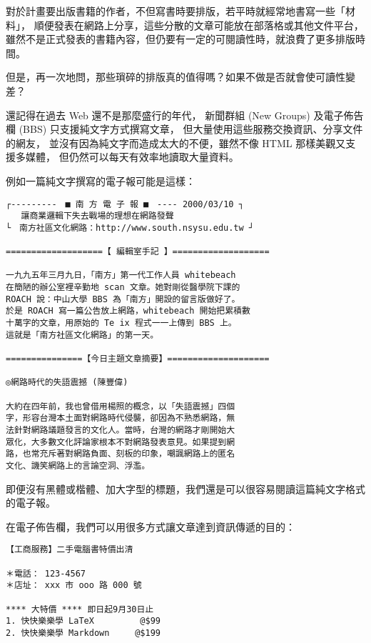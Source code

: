 \documentclass[a4paper,12pt,english]{sphinxmanual}
\begin{document}
對於計畫要出版書籍的作者，不但寫書時要排版，若平時就經常地書寫一些「材料」，
順便發表在網路上分享，這些分散的文章可能放在部落格或其他文件平台，
雖然不是正式發表的書籍內容，但仍要有一定的可閱讀性時，就浪費了更多排版時間。

但是，再一次地問，那些瑣碎的排版真的值得嗎？如果不做是否就會使可讀性變差？

還記得在過去 Web 還不是那麼盛行的年代，
新聞群組 (New Groups) 及電子佈告欄 (BBS) 只支援純文字方式撰寫文章，
但大量使用這些服務交換資訊、分享文件的網友，
並沒有因為純文字而造成太大的不便，雖然不像 HTML 那樣美觀又支援多媒體，
但仍然可以每天有效率地讀取大量資料。

例如一篇純文字撰寫的電子報可能是這樣：

\begin{Verbatim}[commandchars=@\[\]]
┌---------　■ 南 方 電 子 報 ■　---- 2000/03/10 ┐
   讓商業邏輯下失去戰場的理想在網路發聲
└　南方社區文化網路：http://www.south.nsysu.edu.tw ┘

===================【 編輯室手記 】===================

一九九五年三月九日，「南方」第一代工作人員 whitebeach
在簡陋的辦公室裡辛勤地 scan 文章。她對剛從醫學院下課的
ROACH 說：中山大學 BBS 為「南方」開設的留言版做好了。
於是 ROACH 寫一篇公告放上網路，whitebeach 開始把累積數
十萬字的文章，用原始的 Te ix 程式一一上傳到 BBS 上。
這就是「南方社區文化網路」的第一天。

===============【今日主題文章摘要】====================

◎網路時代的失語震撼 (陳豐偉)

大約在四年前，我也曾借用楊照的概念，以「失語震撼」四個
字，形容台灣本土面對網路時代侵襲，卻因為不熟悉網路，無
法針對網路議題發言的文化人。當時，台灣的網路才剛開始大
眾化，大多數文化評論家根本不對網路發表意見。如果提到網
路，也常充斥著對網路負面、刻板的印象，嘲諷網路上的匿名
文化、譏笑網路上的言論空洞、浮濫。
\end{Verbatim}

即便沒有黑體或楷體、加大字型的標題，我們還是可以很容易閱讀這篇純文字格式的電子報。

在電子佈告欄，我們可以用很多方式讓文章達到資訊傳遞的目的：

\begin{Verbatim}[commandchars=@\[\]]
【工商服務】二手電腦書特價出清

＊電話： 123-4567
＊店址： xxx 市 ooo 路 000 號

**** 大特價 **** 即日起9月30日止
1. 快快樂樂學 LaTeX         @$99
2. 快快樂樂學 Markdown     @$199
\end{Verbatim}
\end{document}
